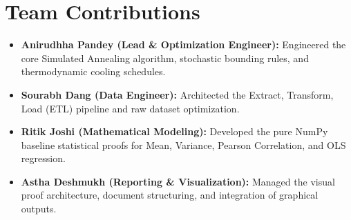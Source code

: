 \documentclass[12pt, a4paper]{article}
\begin{document}
\vspace{1cm}

\section*{Team Contributions}
\begin{itemize}
    \item \textbf{Anirudhha Pandey (Lead \& Optimization Engineer):} Engineered the core Simulated Annealing algorithm, stochastic bounding rules, and thermodynamic cooling schedules.
    \item \textbf{Sourabh Dang (Data Engineer):} Architected the Extract, Transform, Load (ETL) pipeline and raw dataset optimization.
    \item \textbf{Ritik Joshi (Mathematical Modeling):} Developed the pure NumPy baseline statistical proofs for Mean, Variance, Pearson Correlation, and OLS regression.
    \item \textbf{Astha Deshmukh (Reporting \& Visualization):} Managed the visual proof architecture, document structuring, and integration of graphical outputs.
\end{itemize}

\newpage
\begin{abstract}
Summary statistics are the bedrock of exploratory data analysis, yet relying exclusively on metrics such as mean, variance, Pearson correlation, and regression trajectories introduces critical analytical blind spots. This implementation leverages the theoretical foundations of Anscombe's Quartet and the Datasaurus Dozen to mathematically prove that radically divergent spatial geometries can share identical statistical signatures. Operating under strict constraints, the team developed a custom NumPy statistical engine, intentionally prohibiting abstraction libraries. Furthermore, we engineered a Simulated Annealing (SA) algorithm that successfully perturbed a baseline point cloud (\textit{dino}) into a target geometry (\textit{star}). Over 150,000 iterations, the SA engine achieved an 80.35\% reduction in spatial divergence, strictly bounded by a mathematical Gatekeeper that restricted statistical drift to a 0.1 tolerance limit across all core metrics.
\end{abstract}

\newpage
\tableofcontents

\newpage
\listoffigures

\newpage
\end{document}
